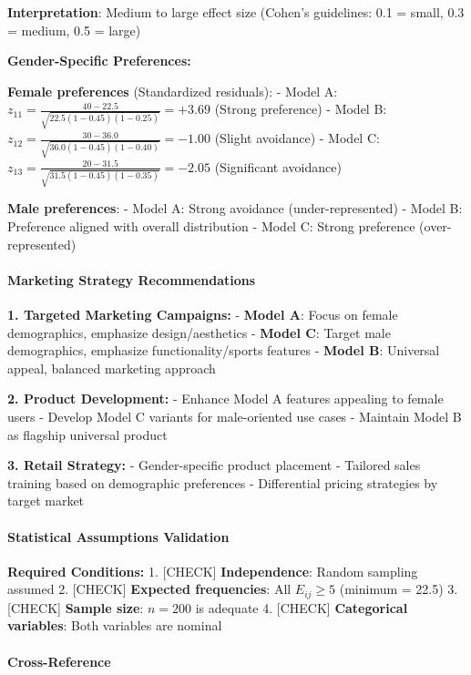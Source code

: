 \documentclass[11pt]{article}
\begin{document}
\textbf{Interpretation}: Medium to large effect size (Cohen's
guidelines: 0.1 = small, 0.3 = medium, 0.5 = large)

\textbf{Gender-Specific Preferences:}

\textbf{Female preferences} (Standardized residuals): - Model A:
\(z_{11} = \frac{40 - 22.5}{\sqrt{22.5(1-0.45)(1-0.25)}} = +3.69\)
(Strong preference) - Model B:
\(z_{12} = \frac{30 - 36.0}{\sqrt{36.0(1-0.45)(1-0.40)}} = -1.00\)
(Slight avoidance) - Model C:
\(z_{13} = \frac{20 - 31.5}{\sqrt{31.5(1-0.45)(1-0.35)}} = -2.05\)
(Significant avoidance)

\textbf{Male preferences}: - Model A: Strong avoidance
(under-represented) - Model B: Preference aligned with overall
distribution - Model C: Strong preference (over-represented)

\paragraph{Marketing Strategy
Recommendations}\label{marketing-strategy-recommendations}

\textbf{1. Targeted Marketing Campaigns:} - \textbf{Model A}: Focus on
female demographics, emphasize design/aesthetics - \textbf{Model C}:
Target male demographics, emphasize functionality/sports features -
\textbf{Model B}: Universal appeal, balanced marketing approach

\textbf{2. Product Development:} - Enhance Model A features appealing to
female users - Develop Model C variants for male-oriented use cases -
Maintain Model B as flagship universal product

\textbf{3. Retail Strategy:} - Gender-specific product placement -
Tailored sales training based on demographic preferences - Differential
pricing strategies by target market

\paragraph{Statistical Assumptions
Validation}\label{statistical-assumptions-validation}

\textbf{Required Conditions:} 1. {[}CHECK{]} \textbf{Independence}:
Random sampling assumed 2. {[}CHECK{]} \textbf{Expected frequencies}:
All \(E_{ij} \geq 5\) (minimum = 22.5) 3. {[}CHECK{]} \textbf{Sample
size}: \(n = 200\) is adequate 4. {[}CHECK{]} \textbf{Categorical
variables}: Both variables are nominal

\paragraph{Cross-Reference}\label{cross-reference}
\end{document}
